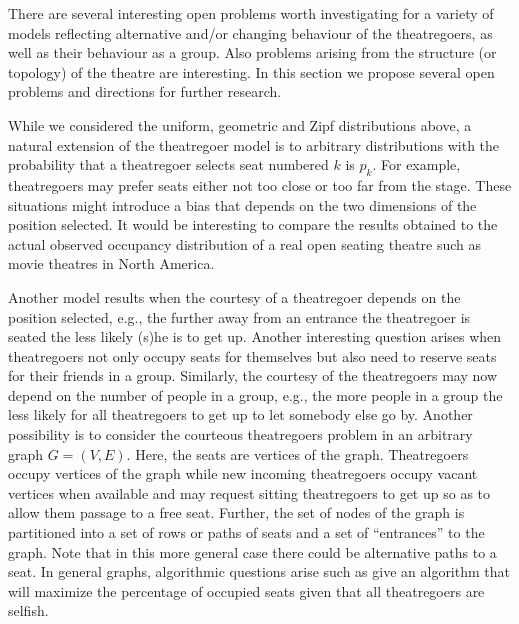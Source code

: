 \documentclass[11pt]{llncs}
\begin{document}
There are several interesting open problems worth investigating
for a variety of models reflecting alternative and/or changing 
behaviour of the
theatregoers, as well as their behaviour as a group.
Also problems arising from
the structure (or topology) of the theatre are interesting.
In this section we 
propose several open problems and directions for further research.
 



While we considered the uniform, geometric and Zipf distributions above,
a natural extension of the theatregoer model is to arbitrary distributions
with the probability that a theatregoer selects seat numbered
$k$ is $p_k$.
For example, theatregoers may prefer seats either not too close or too far from the stage.
These situations might introduce a bias 
that depends on the two dimensions of the position selected.
It would be interesting to compare the results obtained to
the actual observed occupancy distribution of a real open seating theatre
such as movie theatres in North America.  


Another model results when the courtesy of a theatregoer
depends on the position selected, e.g., the further away from
an entrance the theatregoer is seated the less likely (s)he is
to get up.
Another interesting question arises when theatregoers
not only occupy seats for themselves but also 
need to reserve seats for their friends in a group.
Similarly, the courtesy of the theatregoers may now
depend on the number of people in a group, e.g.,
the more people in a group the less likely for all
theatregoers to get up to let somebody else go by. 
Another possibility is to
consider the courteous theatregoers problem in an
arbitrary graph $G= (V, E)$. Here, the seats
are vertices of the graph. Theatregoers
occupy vertices of the graph while new incoming theatregoers
occupy vacant vertices when available and may request 
sitting theatregoers to get up so as to allow them passage
to a free seat. Further, the set of nodes of the graph
is partitioned into a set of rows or paths of seats and a set
of ``entrances'' to the graph.
Note that in this more general case there could be
alternative paths to a seat. 
In general graphs, algorithmic questions arise such as 
give an algorithm that will maximize the 
percentage of occupied seats given that all theatregoers
are selfish.
\end{document}
